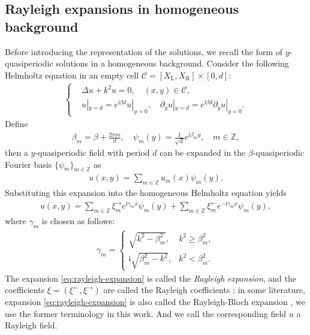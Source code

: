 \documentclass[11pt,fleqn]{article}
\newcommand{\ii}{\mathrm{i}}
\theoremstyle{definition}
\theoremstyle{remark}
\begin{document}
\subsection{Rayleigh expansions in homogeneous background}
Before introducing the representation of the solutions, we recall the form of 
$y$-quasiperiodic solutions in a homogeneous background. Consider the following Helmholtz equation in an empty cell $\mathcal{C} = [X_\mathrm{L},X_\mathrm{R}] \times [0,d]$:\begin{align*}
\begin{cases}
  &\Delta u + k^2 u = 0, \quad (x, y) \in \mathcal{C},\\
  &u|_{y = d} = e^{\ii\beta d} u|_{y = 0}, \quad \partial_y u|_{y = d} = e^{\ii\beta d} \partial_y u|_{y = 0}.
\end{cases}
\end{align*}
Define \begin{align*}
  \beta_m = \beta + \frac{2\pi m}{d},\quad \psi_m(y) = \frac{1}{\sqrt{d}} e^{\ii \beta_m y},\quad m \in \mathbb{Z},
\end{align*}
then a $y$-quasiperiodic field with period $d$ can be expanded in the $\beta$-quasiperiodic Fourier basis $\{\psi_m\}_{m \in \mathbb{Z}}$ as 
\begin{align*}
  u(x,y) = \sum_{m\in\mathbb{Z}} u_m(x) \psi_m(y).
\end{align*}
Substituting this expansion into the homogeneous Helmholtz equation yields 
\begin{align}
  u(x,y)= \sum_{m\in\mathbb Z} \xi_m^\rightarrow e^{\ii\gamma_m x}\psi_m(y) + 
  \sum_{m\in\mathbb Z} \xi_m^\leftarrow e^{-\ii\gamma_m x}\psi_m(y),
  \label{eq:rayleigh-expansion}
\end{align}
where $\gamma_m$ is chosen as follows: \begin{align*}
  \gamma_m = \begin{cases}
    \sqrt{k^2 - \beta_m^2}, & k^2 \geq \beta_m^2,\\
    \ii\sqrt{\beta_m^2 - k^2}, & k^2 < \beta_m^2.
  \end{cases}
\end{align*}
The expansion \eqref{eq:rayleigh-expansion} is called the \emph{Rayleigh expansion}, and the coefficients $\xi = (\xi^\leftarrow, \xi^\rightarrow)$ are called the Rayleigh coefficients \cite{Arens2006}; in some literature, expansion \eqref{eq:rayleigh-expansion} is also called the Rayleigh-Bloch expansion \cite{Wilcox1984}, we use the former terminology in this work. And we call the corresponding field 
$u$ a Rayleigh field.
\end{document}
